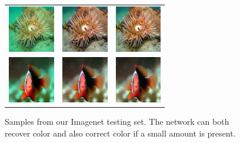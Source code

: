 \documentclass[letterpaper, 10pt, conference]{ieeeconf}
\begin{document}
\begin{figure}
\begin{tabular}{p{1.7cm} p{1.7cm} p{1.7cm}}
   \includegraphics[width=0.8in]{n01914609_1607_real} &
   \includegraphics[width=0.8in]{n01914609_1607_gen_0} &
   \includegraphics[width=0.8in]{n01914609_1607_gen_1} \\

   \includegraphics[width=0.8in]{n02607072_6241_real} &
   \includegraphics[width=0.8in]{n02607072_6241_gen_0} &
   \includegraphics[width=0.8in]{n02607072_6241_gen_1} \\

\end{tabular}
\caption{Samples from our Imagenet testing set. The network can both recover color and also correct color if a small amount is present.}
\label{fig:test_samples}
\end{figure}

\end{document}
